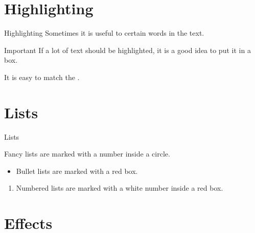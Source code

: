 \documentclass[aspectratio=169]{beamer}
\begin{document}
\section{Highlighting}


\begin{frame}{Highlighting}
    Sometimes it is useful to  certain words in the text.

    \begin{alertblock}{Important}
        If a lot of text should be \alert{highlighted}, it is a good idea to put it in a box.
    \end{alertblock}
    

    It is easy to match the .
\end{frame}


\section{Lists}


\begin{frame}{Lists}
    \begin{fancylist}
        \item Fancy lists are marked with a number inside a circle.
    \end{fancylist}

    \begin{itemize}
        \item
        Bullet lists are marked with a red box.
    \end{itemize}

    \begin{enumerate}
        \item
        Numbered lists are marked with a white number inside a red box.
    \end{enumerate}
\end{frame}


\section{Effects}
\end{document}
